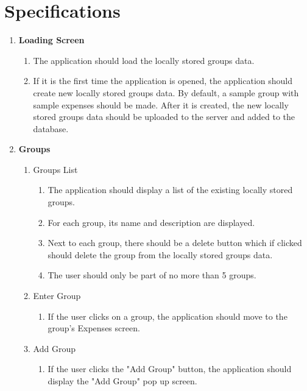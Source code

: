 \documentclass[conference]{IEEEtran}
\begin{document}
\section{Specifications}
    \begin{enumerate}
        \item \textbf{Loading Screen}
            \begin{enumerate}
                \item The application should load the locally stored groups data.
                \item If it is the first time the application is opened, the application should create new locally stored groups data. By default, a sample group with sample expenses should be made. After it is created, the new locally stored groups data should be uploaded to the server and added to the database.
            \end{enumerate}
        \item \textbf{Groups}
            \begin{enumerate}
                \item Groups List
                    \begin{enumerate}
                        \item The application should display a list of the existing locally stored groups.
                        \item For each group, its name and description are displayed.
                        \item Next to each group, there should be a delete button which if clicked should delete the group from the locally stored groups data.
                        \item The user should only be part of no more than 5 groups.
                    \end{enumerate}
                \item Enter Group
                    \begin{enumerate}
                        \item If the user clicks on a group, the application should move to the group's Expenses screen.
                    \end{enumerate}
                \item Add Group
                    \begin{enumerate}
                        \item If the user clicks the "Add Group" button, the application should display the "Add Group" pop up screen.

\end{enumerate}
\end{enumerate}
\end{enumerate}
\end{document}
